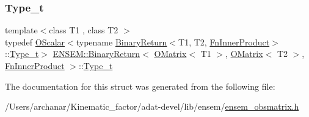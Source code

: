 \subsubsection{\texorpdfstring{Type\_t}{Type\_t}\hspace{0.1cm}{\footnotesize\ttfamily [3/3]}}
{\footnotesize\ttfamily template$<$class T1 , class T2 $>$ \\
typedef \mbox{\hyperlink{classENSEM_1_1OScalar}{O\+Scalar}}$<$typename \mbox{\hyperlink{structENSEM_1_1BinaryReturn}{Binary\+Return}}$<$T1, T2, \mbox{\hyperlink{structENSEM_1_1FnInnerProduct}{Fn\+Inner\+Product}}$>$\+::\mbox{\hyperlink{structENSEM_1_1BinaryReturn_3_01OMatrix_3_01T1_01_4_00_01OMatrix_3_01T2_01_4_00_01FnInnerProduct_01_4_a28a5e6d9f636db51eb542a0a4602c034}{Type\+\_\+t}}$>$ \mbox{\hyperlink{structENSEM_1_1BinaryReturn}{E\+N\+S\+E\+M\+::\+Binary\+Return}}$<$ \mbox{\hyperlink{classENSEM_1_1OMatrix}{O\+Matrix}}$<$ T1 $>$, \mbox{\hyperlink{classENSEM_1_1OMatrix}{O\+Matrix}}$<$ T2 $>$, \mbox{\hyperlink{structENSEM_1_1FnInnerProduct}{Fn\+Inner\+Product}} $>$\+::\mbox{\hyperlink{structENSEM_1_1BinaryReturn_3_01OMatrix_3_01T1_01_4_00_01OMatrix_3_01T2_01_4_00_01FnInnerProduct_01_4_a28a5e6d9f636db51eb542a0a4602c034}{Type\+\_\+t}}}



The documentation for this struct was generated from the following file\+:\begin{DoxyCompactItemize}
\item 
/\+Users/archanar/\+Kinematic\+\_\+factor/adat-\/devel/lib/ensem/\mbox{\hyperlink{adat-devel_2lib_2ensem_2ensem__obsmatrix_8h}{ensem\+\_\+obsmatrix.\+h}}\end{DoxyCompactItemize}
